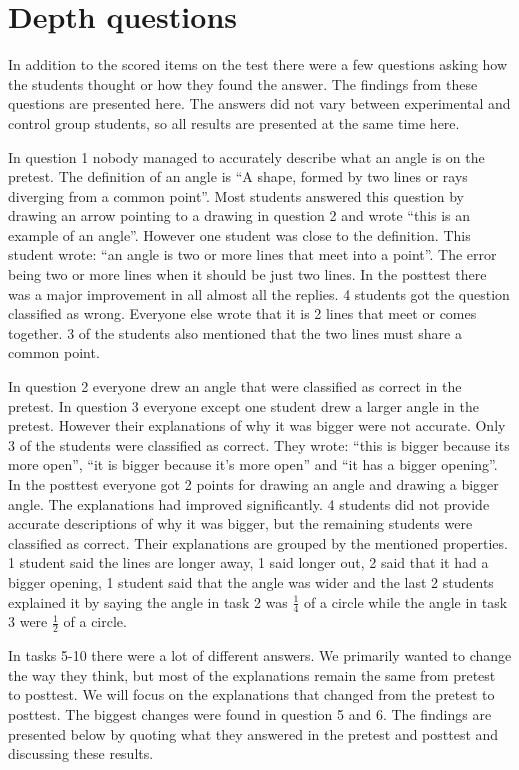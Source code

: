 \section{Depth questions}
In addition to the scored items on the test there were a few questions asking how the students thought or how they found the answer. The findings from these questions are presented here. The answers did not vary between experimental and control group students, so all results are presented at the same time here.

\bigskip\noindent
In question 1 nobody managed to accurately describe what an angle is on the pretest. The definition of an angle is ``A shape, formed by two lines or rays diverging from a common point''. Most students answered this question by drawing an arrow pointing to a drawing in question 2 and wrote ``this is an example of an angle''. However one student was close to the definition. This student wrote: ``an angle is two or more lines that meet into a point''. The error being two or more lines when it should be just two lines. In the posttest there was a major improvement in all almost all the replies. 4 students got the question classified as wrong. Everyone else wrote that it is 2 lines that meet or comes together. 3 of the students also mentioned that the two lines must share a common point.

\bigskip\noindent
In question 2 everyone drew an angle that were classified as correct in the pretest. In question 3 everyone except one student drew a larger angle in the pretest. However their explanations of why it was bigger were not accurate. Only 3 of the students were classified as correct. They wrote: ``this is bigger because its more open'', ``it is bigger because it's more open'' and ``it has a bigger opening''. In the posttest everyone got 2 points for drawing an angle and drawing a bigger angle. The explanations had improved significantly. 4 students did not provide accurate descriptions of why it was bigger, but the remaining students were classified as correct. Their explanations are grouped by the mentioned properties. 1 student said the lines are longer away, 1 said longer out, 2 said that it had a bigger opening, 1 student said that the angle was wider and the last 2 students explained it by saying the angle in task 2 was $\frac{1}{4}$ of a circle while the angle in task 3 were $\frac{1}{2}$ of a circle.

\bigskip\noindent
In tasks 5-10 there were a lot of different answers. We primarily wanted to change the way they think, but most of the explanations remain the same from pretest to posttest. We will focus on the explanations that changed from the pretest to posttest. The biggest changes were found in question 5 and 6. The findings are presented below by quoting what they answered in the pretest and posttest and discussing these results.

